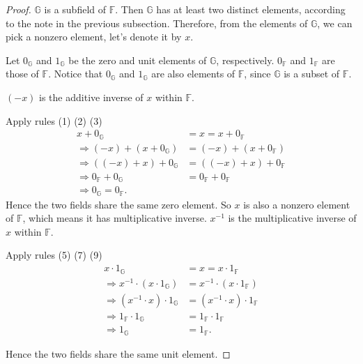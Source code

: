 \begin{proof}
	$\mathbb{G}$ is a subfield of $\mathbb{F}$. Then $\mathbb{G}$ has at least two distinct elements, according to the note in the previous subsection. Therefore, from the elements of $\mathbb{G}$, we can pick a nonzero element, let's denote it by $x$.

	Let $0_{\mathbb{G}}$ and $1_{\mathbb{G}}$ be the zero and unit elements of $\mathbb{G}$, respectively. $0_{\mathbb{F}}$ and $1_{\mathbb{F}}$ are those of $\mathbb{F}$. Notice that $0_{\mathbb{G}}$ and $1_{\mathbb{G}}$ are also elements of $\mathbb{F}$, since $\mathbb{G}$ is a subset of $\mathbb{F}$.

	$(-x)$ is the additive inverse of $x$ within $\mathbb{F}$.

	Apply rules (1) (2) (3)
	\begin{align*}
		x + 0_{\mathbb{G}}                          & = x = x + 0_{\mathbb{F}}          \\
		\Rightarrow (-x) + (x + 0_{\mathbb{G}})     & = (-x) + (x + 0_{\mathbb{F}})     \\
		\Rightarrow ((-x) + x) + 0_{\mathbb{G}}     & = ((-x) + x) + 0_{\mathbb{F}}     \\
		\Rightarrow 0_{\mathbb{F}} + 0_{\mathbb{G}} & = 0_{\mathbb{F}} + 0_{\mathbb{F}} \\
		\Rightarrow 0_{\mathbb{G}} = 0_{\mathbb{F}}.
	\end{align*}
	Hence the two fields share the same zero element. So $x$ is also a nonzero element of $\mathbb{F}$, which means it has multiplicative inverse. $x^{-1}$ is the multiplicative inverse of $x$ within $\mathbb{F}$.

	Apply rules (5) (7) (9)
	\begin{align*}
		x\cdot 1_{\mathbb{G}}                           & = x = x\cdot 1_{\mathbb{F}}           \\
		\Rightarrow x^{-1}\cdot (x\cdot 1_{\mathbb{G}}) & = x^{-1}\cdot (x\cdot 1_{\mathbb{F}}) \\
		\Rightarrow (x^{-1}\cdot x)\cdot 1_{\mathbb{G}} & = (x^{-1}\cdot x)\cdot 1_{\mathbb{F}} \\
		\Rightarrow 1_{\mathbb{F}}\cdot 1_{\mathbb{G}}  & = 1_{\mathbb{F}}\cdot 1_{\mathbb{F}}  \\
		\Rightarrow 1_{\mathbb{G}}                      & = 1_{\mathbb{F}}.
	\end{align*}

	Hence the two fields share the same unit element.
\end{proof}

